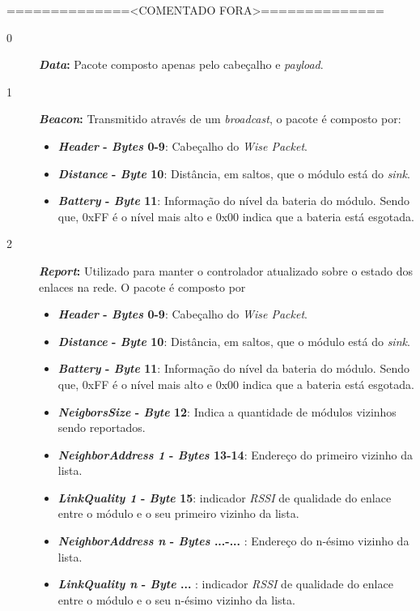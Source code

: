 \iffalse==============<COMENTADO FORA>==============
\begin{description}
    \item [0]\textbf{\textit{Data}:} Pacote composto apenas pelo cabeçalho e \textit{payload}. 
    \item [1]\textbf{\textit{Beacon}:} Transmitido através de um \textit{broadcast}, o pacote é composto por:
        \begin{itemize} 
            \item \textbf{\textit{Header} - \textit{Bytes} 0-9}: Cabeçalho do \textit{ Wise Packet}.
            \item \textbf{\textit{Distance} - \textit{Byte} 10}: Distância, em saltos, que o módulo está do \textit{sink}.
            \item \textbf{\textit{Battery} - \textit{Byte} 11}: Informação do nível da bateria do módulo. Sendo que, 0xFF é o nível mais alto e 0x00 indica que a bateria está esgotada.
        \end{itemize}
    \item [2]\textbf{\textit{Report}:} Utilizado para manter o controlador atualizado sobre o estado dos enlaces na rede. O pacote é composto por
        \begin{itemize} 
            \item \textbf{\textit{Header} - \textit{Bytes} 0-9}: Cabeçalho do \textit{ Wise Packet}.
            \item \textbf{\textit{Distance} - \textit{Byte} 10}: Distância, em saltos, que o módulo está do \textit{sink}.
            \item \textbf{\textit{Battery} - \textit{Byte} 11}: Informação do nível da bateria do módulo. Sendo que, 0xFF é o nível mais alto e 0x00 indica que a bateria está esgotada.
            \item \textbf{\textit{NeigborsSize} - \textit{Byte} 12}: Indica a quantidade de módulos vizinhos sendo reportados.
            \item \textbf{\textit{NeighborAddress 1} - \textit{Bytes} 13-14}: Endereço do primeiro vizinho da lista.
            \item \textbf{\textit{LinkQuality 1} - \textit{Byte} 15}: indicador \textit{RSSI} de qualidade do enlace entre o módulo e o seu primeiro vizinho da lista.
            \item \textbf{\textit{NeighborAddress n} - \textit{Bytes} ...-... }: Endereço do n-ésimo vizinho da lista.
            \item \textbf{\textit{LinkQuality n} - \textit{Byte} ... }: indicador \textit{RSSI} de qualidade do enlace entre o módulo e o seu n-ésimo vizinho da lista.

\end{itemize}
\end{description}
